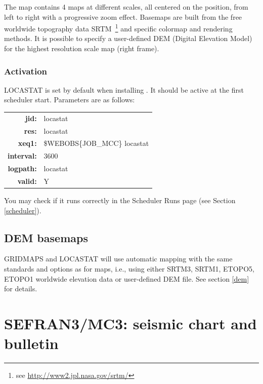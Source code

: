 The map contains 4 maps at different scales, all centered on the  position, from left to right with a progressive zoom effect. Basemaps are built from the free worldwide topography data SRTM~\footnote{see \url{http://www2.jpl.nasa.gov/srtm/}} and specific colormap and rendering methods. It is possible to specify a user-defined DEM (Digital Elevation Model) for the highest resolution scale map (right frame).





\subsubsection{Activation}

LOCASTAT is set by default when installing \webobs. It should be active at the first scheduler start. Parameters are as follows:

\begin{tabular}{rl}
\textbf{jid:}      & locastat \\
\textbf{res:}      & locastat \\
\textbf{xeq1:}     & \$WEBOBS\{JOB\_MCC\} locastat \\
\textbf{interval:} & 3600 \\
\textbf{logpath:}  & locastat \\
\textbf{valid:}    & Y \\
\end{tabular}

You may check if it runs correctly in the Scheduler Runs page (see Section \ref{scheduler}).

\subsection{DEM basemaps}

GRIDMAPS and LOCASTAT will use automatic mapping with the same standards and options as for  maps, i.e., using either SRTM3, SRTM1, ETOPO5, ETOPO1 worldwide elevation data or user-defined DEM file. See section \ref{dem} for details.


\newpage
\section{SEFRAN3/MC3: seismic chart and bulletin}

